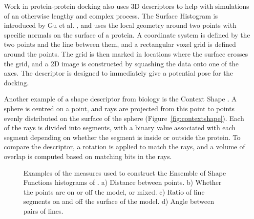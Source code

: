 \documentclass[11pt,a4paper]{kth-mag}
\begin{document}
Work in protein-protein docking also uses 3D descriptors to help with
simulations of an otherwise lengthy and complex process. The Surface Histogram
is introduced by Gu et al. \cite{gu2012surface}, and uses the local geometry
around two points with specific normals on the surface of a protein. A
coordinate system is defined by the two points and the line between them, and a
rectangular voxel grid is defined around the points. The grid is then marked in
locations where the surface crosses the grid, and a 2D image is constructed by
squashing the data onto one of the axes. The descriptor is designed to
immediately give a potential pose for the docking.

Another example of a shape descriptor from biology is the Context Shape
\cite{shentu2008context}. A sphere is centred on a point, and rays are projected
from this point to points evenly distributed on the surface of the sphere (Figure~\ref{fig:contextshape}). Each
of the rays is divided into segments, with a binary value associated with each
segment depending on whether the segment is inside or outside the protein. To
compare the descriptor, a rotation is applied to match the rays, and a volume of
overlap is computed based on matching bits in the rays.
 
\begin{figure}
  \centering
  \caption{Examples of the measures used to construct the Ensemble of Shape
    Functions histograms of \cite{wohlkinger2011ensemble}. a) Distance between
    points. b) Whether the points are on or off the model, or mixed. c) Ratio of
  line segments on and off the surface of the model. d) Angle between pairs of lines.}
  \label{fig:wohlESF}
\end{figure}
\end{document}
